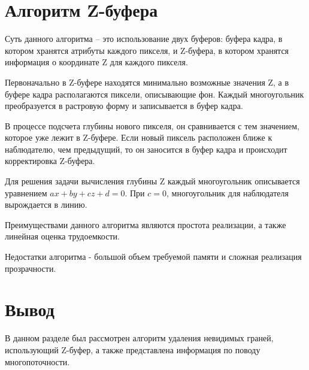 \section{Алгоритм Z-буфера}

Суть данного алгоритма -- это использование двух буферов: буфера
кадра, в котором хранятся атрибуты каждого пикселя, и Z-буфера, в котором
хранятся информация о координате Z для каждого пикселя.

Первоначально в Z-буфере находятся минимально возможные значения
Z, а в буфере кадра располагаются пиксели, описывающие фон. Каждый
многоугольник преобразуется в растровую форму и записывается в буфер
кадра.

В процессе подсчета глубины нового пикселя, он сравнивается с тем
значением, которое уже лежит в Z-буфере. Если новый пиксель расположен
ближе к наблюдателю, чем предыдущий, то он заносится в буфер кадра и
происходит корректировка Z-буфера.

Для решения задачи вычисления глубины Z каждый многоугольник
описывается уравнением $ax + by + cz + d = 0$. При $c = 0$, многоугольник для
наблюдателя вырождается в линию.

Преимуществами данного алгоритма являются простота реализации, а также линейная оценка трудоемкости.

Недостатки алгоритма - большой объем требуемой памяти и сложная реализация прозрачности.

\section*{Вывод}

В данном разделе был рассмотрен алгоритм удаления невидимых граней, использующий Z-буфер, а также представлена информация по поводу многопоточности.
